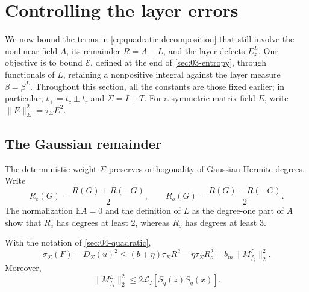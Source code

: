 \section{Controlling the layer errors}\label{sec:05-layers}

We now bound the terms in \eqref{eq:quadratic-decomposition} that still involve the nonlinear field $A$, its remainder $R=A-L$, and the layer defects $E_z^L$. Our objective is to bound $\mathcal{E}$, defined at the end of \cref{sec:03-entropy}, through functionals of $L$, retaining a nonpositive integral against the layer measure $\beta=\beta^L$. Throughout this section, all the constants are those fixed earlier; in particular, $t_\pm=t_c\pm t_r$ and $\Sigma=I+T$. For a symmetric matrix field $E$, write $\|E\|_\Sigma^2=\tau_\Sigma E^2$.

\subsection{The Gaussian remainder}

The deterministic weight $\Sigma$ preserves orthogonality of Gaussian Hermite degrees.  Write
\[
 R_e(G)=\frac{R(G)+R(-G)}2,\qquad
 R_o(G)=\frac{R(G)-R(-G)}2.
\]
The normalization $\mathbb{E} A=0$ and the definition of $L$ as the degree-one part of $A$ show that $R_e$ has degrees at least $2$, whereas $R_o$ has degrees at least $3$.

\begin{lemma}\label{lem:layers-gaussian}
With the notation of \cref{sec:04-quadratic},
\begin{equation}
 \sigma_\Sigma(F)-D_\Sigma(u)^2
 \le (b+\eta)\tau_\Sigma R^2-\eta\tau_\Sigma R_o^2
       +b_m\|M_{f_q}^L\|_2^2.
 \label{eq:projection-quadratic-estimate}
\end{equation}
Moreover,
\[
 \|M_{f_q}^L\|_2^2
 \le 2\mathcal{L}_I[S_q(z)S_q(x)].
\]
\end{lemma}


